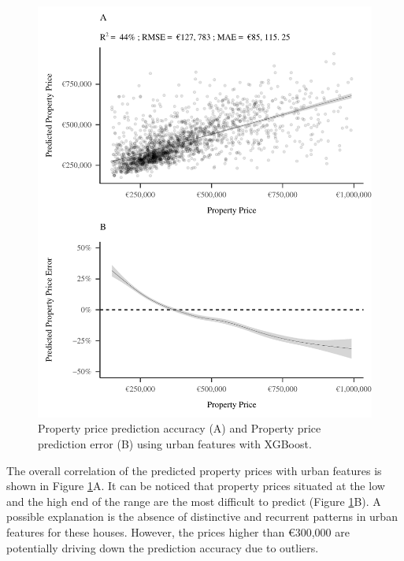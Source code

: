 \documentclass[conference,final,]{IEEEtran}
\begin{document}
\begin{figure}
\includegraphics[width=0.98\columnwidth]{dsaa_application_manuscript_files/figure-latex/osm-features-xgb-1} \caption{Property price prediction accuracy (A) and Property price prediction error (B) using urban features with XGBoost.}\label{fig:osm-features-xgb}
\end{figure}

The overall correlation of the predicted property prices with urban features is shown in Figure \ref{fig:osm-features-xgb}A. It can be noticed that property prices situated at the low and the high end of the range are the most difficult to predict (Figure \ref{fig:osm-features-xgb}B). A possible explanation is the absence of distinctive and recurrent patterns in urban features for these houses. However, the prices higher than €300,000 are potentially driving down the prediction accuracy due to outliers.
\end{document}
